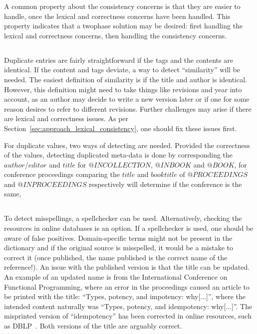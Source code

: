 A common property about the consistency concerns is that they are
easier to handle, once the lexical and correctness concerns have been
handled.  This property indicates that a twophase solution may be
desired: first handling the lexical and correctness concerns, then
handling the consistency concerns.


\subsection{}
\label{sec:approach_duplicates}

Duplicate entries are fairly straightforward if the tags and the
contents are identical.  If the content and tags deviate, a way to
detect ``similarity'' will be needed.  The easiest definition of
similarity is if the title and author is identical.  However, this
definition might need to take things like revisions and year into
account, as an author may decide to write a new version later or if
one for some reason desires to refer to different revisions.  Further
challenges may arise if there are lexical and correctness issues.  As
per Section~\ref{sec:approach_lexical_consistency}, one should fix
these issues first.

For duplicate values, two ways of detecting are needed.  Provided the
correctness of the values, detecting duplicated meta-data is done by
corresponding the $author$/$editor$ and $title$ for $@INCOLLECTION$,
$@INBOOK$ and $@BOOK$, for conference proceedings comparing the
$title$ and $booktitle$ of $@PROCEEDINGS$ and $@INPROCEEDINGS$
respectively will determine if the conference is the same,


\subsection{}

To detect misspellings, a spellchecker can be used.  Alternatively,
checking the resources in online databases is an option.  If a
spellchecker is used, one should be aware of false positives.
Domain-specific terms might not be present in the dictionary and if
the original source is misspelled, it would be a mistake to correct it
(once published, the name published is the correct name of the
reference!).  An issue with the published version is that the title
can be updated.  An example of an updated name is from the
International Conference on Functional Programming, where an error in
the proceedings caused an article to be printed with the title:
``Types, potency, and impotency: why[...]'', where the intended
content naturally was ``Types, potency, and idempotency: why[...]''.
The misprinted version of ``idempotency'' has been corrected in online
resources, such as DBLP~\cite{bibtex2006_dblp}. Both versions of the
title are arguably correct.

